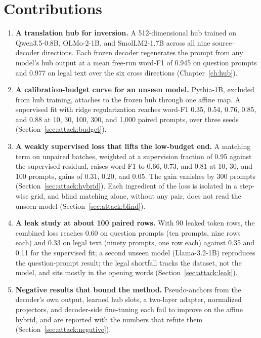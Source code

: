 \section{Contributions}\label{sec:intro:contributions}

\begin{enumerate}
\item \textbf{A translation hub for inversion.} A 512-dimensional hub trained on Qwen3.5-0.8B, OLMo-2-1B, and SmolLM2-1.7B across all nine source--decoder directions. Each frozen decoder regenerates the prompt from any model's hub output at a mean free-run word-F1 of 0.945 on question prompts and 0.977 on legal text over the six cross directions (Chapter~\ref{ch:hub}).
\item \textbf{A calibration-budget curve for an unseen model.} Pythia-1B, excluded from hub training, attaches to the frozen hub through one affine map. A supervised fit with ridge regularization reaches word-F1 0.35, 0.54, 0.76, 0.85, and 0.88 at 10, 30, 100, 300, and 1,000 paired prompts, over three seeds (Section~\ref{sec:attack:budget}).
\item \textbf{A weakly supervised loss that lifts the low-budget end.} A matching term on unpaired batches, weighted at a supervision fraction of 0.95 against the supervised residual, raises word-F1 to 0.66, 0.73, and 0.81 at 10, 30, and 100 prompts, gains of 0.31, 0.20, and 0.05. The gain vanishes by 300 prompts (Section~\ref{sec:attack:hybrid}). Each ingredient of the loss is isolated in a step-wise grid, and blind matching alone, without any pair, does not read the unseen model (Section~\ref{sec:attack:blind}).
\item \textbf{A leak study at about 100 paired rows.} With 90 leaked token rows, the combined loss reaches 0.60 on question prompts (ten prompts, nine rows each) and 0.33 on legal text (ninety prompts, one row each) against 0.35 and 0.11 for the supervised fit; a second unseen model (Llama-3.2-1B) reproduces the question-prompt result; the legal shortfall tracks the dataset, not the model, and sits mostly in the opening words (Section~\ref{sec:attack:leak}).
\item \textbf{Negative results that bound the method.} Pseudo-anchors from the decoder's own output, learned hub slots, a two-layer adapter, normalized projectors, and decoder-side fine-tuning each fail to improve on the affine hybrid, and are reported with the numbers that refute them (Section~\ref{sec:attack:negative}).
\end{enumerate}
